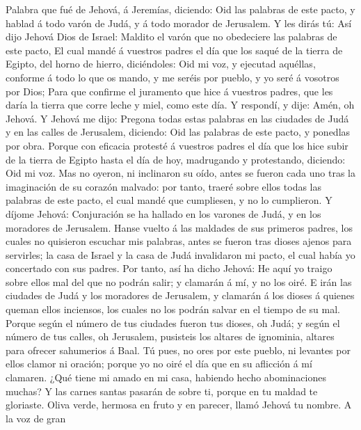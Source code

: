  Palabra que fué de Jehová, á Jeremías, diciendo:
 Oid las palabras de este pacto, y hablad á todo varón de
Judá, y á todo morador de Jerusalem.  Y les dirás tú: Así
dijo Jehová Dios de Israel: Maldito el varón que no obedeciere las
palabras de este pacto,  El cual mandé á vuestros padres
el día que los saqué de la tierra de Egipto, del horno de hierro,
diciéndoles: Oid mi voz, y ejecutad aquéllas, conforme á todo lo que os
mando, y me seréis por pueblo, y yo seré á vosotros por Dios;
 Para que confirme el juramento que hice á vuestros
padres, que les daría la tierra que corre leche y miel, como este día. Y
respondí, y dije: Amén, oh Jehová.  Y Jehová me dijo:
Pregona todas estas palabras en las ciudades de Judá y en las calles de
Jerusalem, diciendo: Oid las palabras de este pacto, y ponedlas por
obra.  Porque con eficacia protesté á vuestros padres el
día que los hice subir de la tierra de Egipto hasta el día de hoy,
madrugando y protestando, diciendo: Oid mi voz.  Mas no
oyeron, ni inclinaron su oído, antes se fueron cada uno tras la
imaginación de su corazón malvado: por tanto, traeré sobre ellos todas
las palabras de este pacto, el cual mandé que cumpliesen, y no lo
cumplieron.  Y díjome Jehová: Conjuración se ha hallado en
los varones de Judá, y en los moradores de Jerusalem. 
Hanse vuelto á las maldades de sus primeros padres, los cuales no
quisieron escuchar mis palabras, antes se fueron tras dioses ajenos para
servirles; la casa de Israel y la casa de Judá invalidaron mi pacto, el
cual había yo concertado con sus padres.  Por tanto, así
ha dicho Jehová: He aquí yo traigo sobre ellos mal del que no podrán
salir; y clamarán á mí, y no los oiré.  E irán las
ciudades de Judá y los moradores de Jerusalem, y clamarán á los dioses á
quienes queman ellos inciensos, los cuales no los podrán salvar en el
tiempo de su mal.  Porque según el número de tus ciudades
fueron tus dioses, oh Judá; y según el número de tus calles, oh
Jerusalem, pusisteis los altares de ignominia, altares para ofrecer
sahumerios á Baal.  Tú pues, no ores por este pueblo, ni
levantes por ellos clamor ni oración; porque yo no oiré el día que en su
aflicción á mí clamaren.  ¿Qué tiene mi amado en mi casa,
habiendo hecho abominaciones muchas? Y las carnes santas pasarán de
sobre ti, porque en tu maldad te gloriaste.  Oliva verde,
hermosa en fruto y en parecer, llamó Jehová tu nombre. A la voz de gran
